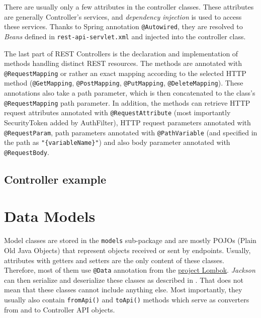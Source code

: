 There are usually only a few attributes in the controller classes. These attributes are generally Controller’s services, and \emph{dependency injection} is used to access these services. Thanks to Spring annotation \texttt{@Autowired}, they are resolved to \emph{Beans} defined in \texttt{rest-api-servlet.xml} and injected into the controller class.

The last part of REST Controllers is the declaration and implementation of methods handling distinct REST resources. The methods are annotated with \texttt{@RequestMapping} or rather an exact mapping according to the selected HTTP method (\texttt{@GetMapping}, \texttt{@PostMapping}, \texttt{@PutMapping}, \texttt{@DeleteMapping}).
These annotations also take a path parameter, which is then concatenated to the class’s \texttt{@RequestMapping} path parameter.
In addition, the methods can retrieve HTTP request attributes annotated with \texttt{@RequestAttribute} (most importantly SecurityToken added by AuthFilter), HTTP request parameters annotated with \texttt{@RequestParam}, path parameters annotated with \texttt{@PathVariable} (and specified in the path as \texttt{"\{variableName\}"}) and also body parameter annotated with \texttt{@RequestBody}.

\subsection{Controller example}


\section{Data Models}
Model classes are stored in the \texttt{models} sub-package and are mostly POJOs (Plain Old Java Objects) that represent objects received or sent by endpoints. Usually, attributes with getters and setters are the only content of these classes. Therefore, most of them use \texttt{@Data} annotation from the \hyperref[sec:lombok]{project Lombok}. \emph{Jackson} can then serialize and deserialize these classes as described in .
That does not mean that these classes cannot include anything else. Most importantly, they usually also contain \texttt{fromApi()} and \texttt{toApi()} methods which serve as converters from and to Controller API objects.

